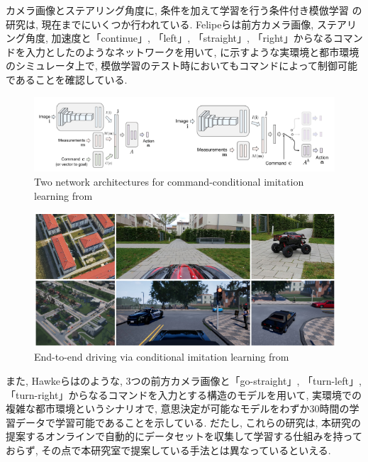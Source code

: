 カメラ画像とステアリング角度に, 条件を加えて学習を行う条件付き模倣学習
の研究は, 現在までにいくつか行われている.
Felipeら\cite{felipe}は前方カメラ画像, ステアリング角度, 加速度と「continue」, 「left」, 「straight」, 「right」からなるコマンドを入力としたのようなネットワークを用いて, に示すような実環境と都市環境のシミュレータ上で, 模倣学習のテスト時においてもコマンドによって制御可能であることを確認している.

\vspace{0.5cm}

\begin{figure}[hbtp]
     \centering
    \includegraphics[keepaspectratio, scale=0.65]
         {images/felipe_network.png}
    \caption{Two network architectures for command-conditional imitation learning from \cite{felipe}}
    \label{Fig:felipe_network}
\end{figure}

\vspace{0.5cm}

\begin{figure}[hbtp]
     \centering
    \includegraphics[keepaspectratio, scale=0.57]
         {images/felipe.png}
    \caption{End-to-end driving via conditional imitation learning from \cite{felipe}}
    \label{Fig:felipe}
\end{figure}

\newpage

また, Hawkeら\cite{hawke}はのような, 3つの前方カメラ画像と「go-straight」, 「turn-left」, 「turn-right」からなるコマンドを入力とする構造のモデルを用いて, 実環境での複雑な都市環境というシナリオで, 意思決定が可能なモデルをわずか30時間の学習データで学習可能であることを示している.
だたし, これらの研究は, 本研究の提案するオンラインで自動的にデータセットを収集して学習する仕組みを持っておらず, その点で本研究室で提案している手法とは異なっているといえる.

